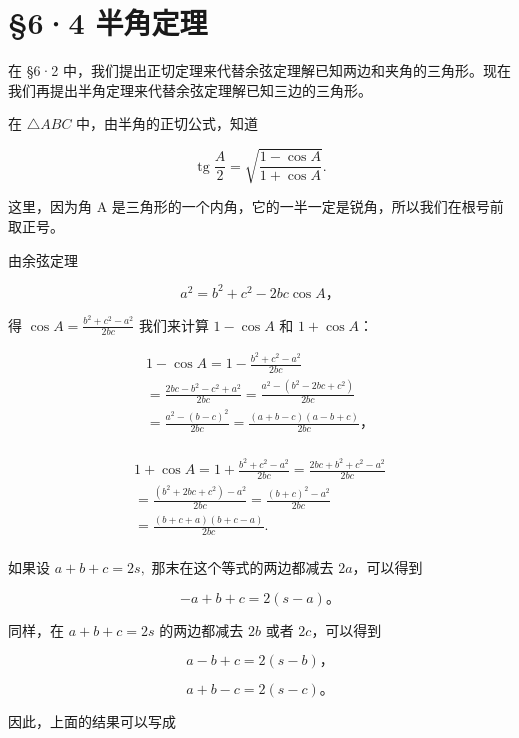 \section{§6·4 半角定理}

在 §6·2
中，我们提出正切定理来代替余弦定理解已知两边和夹角的三角形。现在我们再提出半角定理来代替余弦定理解已知三边的三角形。

在 \(\triangle ABC\) 中，由半角的正切公式，知道

\[
\operatorname{tg} \frac {A}{2} = \sqrt {\frac {1 - \cos A}{1 + \cos A}}.
\]

这里，因为角 A
是三角形的一个内角，它的一半一定是锐角，所以我们在根号前取正号。

由余弦定理

\[
a ^ {2} = b ^ {2} + c ^ {2} - 2 b c \cos A\text{，}
\]

得 \(\cos A = \frac{b^2 + c^2 - a^2}{2bc}\) 我们来计算 \(1 - \cos A\) 和
\(1 + \cos A\)：

\[
\begin{array}{l} 1 - \cos A = 1 - \frac {b ^ {2} + c ^ {2} - a ^ {2}}{2 b c} \\ = \frac {2 b c - b ^ {2} - c ^ {2} + a ^ {2}}{2 b c} = \frac {a ^ {2} - (b ^ {2} - 2 b c + c ^ {2})}{2 b c} \\ = \frac {a ^ {2} - (b - c) ^ {2}}{2 b c} = \frac {(a + b - c) (a - b + c)}{2 b c}\text{，} \\ \end{array}
\]

\[
\begin{array}{l} 1 + \cos A = 1 + \frac {b ^ {2} + c ^ {2} - a ^ {2}}{2 b c} = \frac {2 b c + b ^ {2} + c ^ {2} - a ^ {2}}{2 b c} \\ = \frac {(b ^ {2} + 2 b c + c ^ {2}) - a ^ {2}}{2 b c} = \frac {(b + c) ^ {2} - a ^ {2}}{2 b c} \\ = \frac {(b + c + a) (b + c - a)}{2 b c}. \\ \end{array}
\]

如果设 \(a + b + c = 2s,\) 那末在这个等式的两边都减去 \(2a\)，可以得到

\[
- a + b + c = 2 (s - a)\text{。}
\]

同样，在 \(a + b + c = 2s\) 的两边都减去 \(2b\) 或者 \(2c\)，可以得到

\[
a - b + c = 2 (s - b)\text{，}
\]

\[
a + b - c = 2 (s - c)\text{。}
\]

因此，上面的结果可以写成

